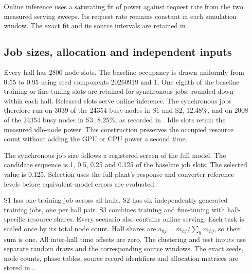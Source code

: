 Online inference uses a saturating fit of power against request rate from the two measured serving sweeps.
Its request rate remains constant in each simulation window.
The exact fit and its source intervals are retained in .

\subsection{Job sizes, allocation and independent inputs}
Every hall has 2800 node slots.
The baseline occupancy is drawn uniformly from 0.55 to 0.95 using seed components 20260919 and 1.
One eighth of the baseline training or fine-tuning slots are retained for synchronous jobs, rounded down within each hall.
Released slots serve online inference.
The synchronous jobs therefore run on 3039 of the 24354 busy nodes in S1 and S2, 12.48\%, and on 2008 of the 24354 busy nodes in S3, 8.25\%, as recorded in .
Idle slots retain the measured idle-node power.
This construction preserves the occupied resource count without adding the GPU or CPU power a second time.

The synchronous job size follows a registered screen of the full model.
The candidate sequence is 1, 0.5, 0.25 and 0.125 of the baseline job slots.
The selected value is 0.125.
Selection uses the full plant's response and converter reference levels before equivalent-model errors are evaluated.

S1 has one training job across all halls.
S2 has six independently generated training jobs, one per hall pair.
S3 combines training and fine-tuning with hall-specific resource shares.
Every scenario also contains online serving.
Each task is scaled once by its total node count.
Hall shares are $a_{hj}=m_{hj}/\sum_hm_{hj}$, so their sum is one.
All inter-hall time offsets are zero.
The clustering and test inputs use separate random draws and the corresponding source windows.
The exact seeds, node counts, phase tables, source record identifiers and allocation matrices are stored in .
